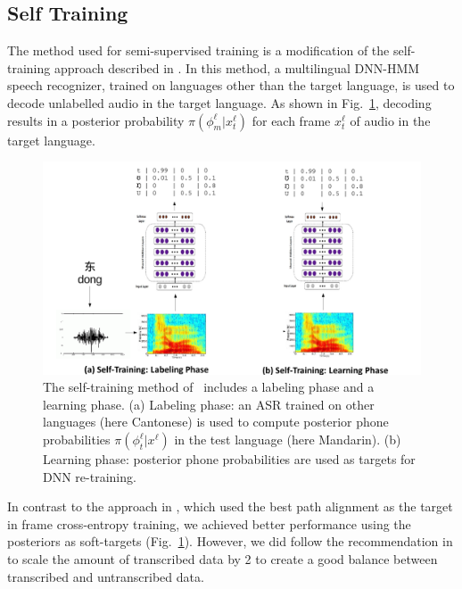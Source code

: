\subsection{Self Training}
\label{sec:selftraining}

The method used for semi-supervised training is a modification of the
self-training approach described in \cite{vesely2013-semi}. In this
method, a multilingual DNN-HMM speech recognizer, trained on languages
other than the target language, is used to decode unlabelled audio in
the target language.  As shown in Fig.~\ref{fig:fig_hager}, decoding
results in a posterior probability $\pi(\phi_m^\ell|x_t^\ell)$ for
each frame $x_t^\ell$ of audio in the target language.

\begin{figure}
  \centerline{\includegraphics[width=5in]{../figs/fig_hager.png}}
  \caption{The self-training method of~\cite{vesely2013-semi} includes
    a labeling phase and a learning phase.  (a) Labeling phase: an ASR
    trained on other languages (here Cantonese) is used to compute
    posterior phone probabilities $\pi(\phi_t^\ell|x^\ell)$ in the
    test language (here Mandarin). (b) Learning phase: posterior phone
    probabilities are used as targets for DNN re-training.}
  \label{fig:fig_hager}
\end{figure}

In contrast to the approach in \cite{vesely2013-semi}, which used the
best path alignment as the target in frame cross-entropy training, we
achieved better performance using the posteriors as soft-targets
(Fig.~\ref{fig:fig_hager}). However, we did follow the recommendation in
\cite{vesely2013-semi} to scale the amount of transcribed data by 2 to 
create a good balance between transcribed and untranscribed data.

